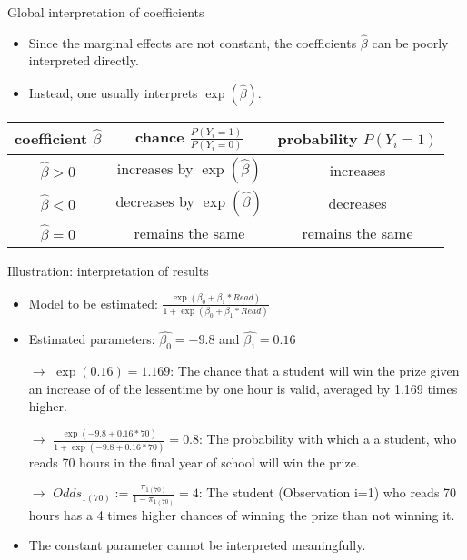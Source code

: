 \documentclass{beamer}
\begin{document}
\begin{frame}{Global interpretation of coefficients}
	\vspace{-3mm}
\begin{itemize}
	\item Since the marginal effects are not constant, the coefficients $\hat{{\beta}}$ can be
	poorly interpreted directly.
	\vspace{3mm}
	\item
	Instead, one usually interprets $\exp(\hat{{\beta}})$.
\end{itemize}
\begin{table}[ht]
	\centering
	\begin{tabular}{ccc}
	\hline
coefficient $\hat{{\beta}}$ & chance $\frac{P(Y_i = 1)}{P(Y_i = 0)}$ & probability $P(Y_i = 1)$\\ 
	\hline
$\hat{{\beta}}> 0$ & increases by $\exp(\hat{{\beta}})$ & increases \\ 
$\hat{{\beta}}< 0$ & decreases by $\exp(\hat{{\beta}})$ & decreases \\ 
$\hat{{\beta}} = 0$ & remains the same & remains the same \\
	\hline
	\end{tabular}
\end{table}



\end{frame}


\begin{frame}{Illustration: interpretation of results}
	\vspace{-3mm}
\begin{itemize}
		\item 
	Model to be estimated: $\frac{\exp{(\beta_0 + \beta_1*Read)}}{1 + \exp{(\beta_0 + \beta_1*Read)}}$
		\vspace{0.2cm}
	\item Estimated parameters: $\hat{{\beta_0}}=-9.8$ and $\hat{{\beta_1}}=0.16$
		\vspace{0.2cm}	
	
	\item [$\rightarrow$] $\exp(0.16) = 1.169$: The chance that a student will win the prize given an increase of
	of the lessentime by one hour is valid, averaged by 1.169 times higher.
	\vspace{0.2cm}	
	\item [$\rightarrow$] $\frac{\exp{(-9.8+0.16*70)}}{1 + \exp{(-9.8+0.16*70)}}=0.8$: The probability with which a
	a student, who reads 70 hours in the final year of school will win the prize.
		\vspace{0.2cm}	
	\item [$\rightarrow$] $Odds_{1(70)}:=\frac{\pi_{1(70)}}{1-\pi_{1(70)}}=4$: The student
	(Observation i=1) who reads 70 hours has a 4 times higher chances of
 winning the prize than  not winning it.
\vspace{0.2cm}	
\item
The constant parameter cannot be interpreted meaningfully.
\end{itemize}
\end{frame}
\end{document}
